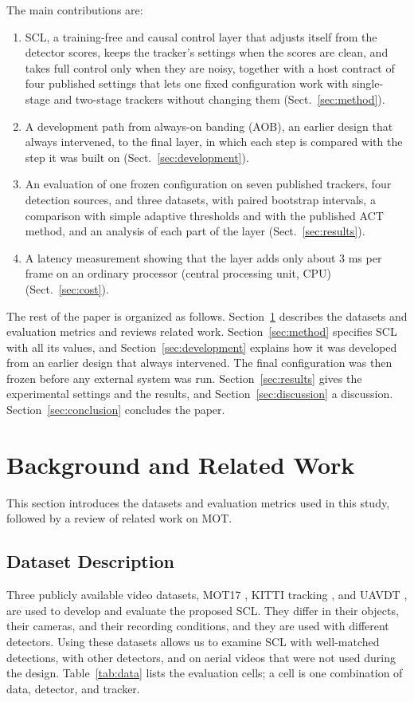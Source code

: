 \documentclass[pdflatex,sn-mathphys-num,iicol]{sn-jnl}
\newcommand{\scl}{SCL}
\newcommand{\aob}{AOB}
\begin{document}
The main contributions are:
\begin{enumerate}
\item \scl{}, a training-free and causal control layer that adjusts itself from the detector scores,
      keeps the tracker's settings when the scores are clean, and takes full control only when they
      are noisy, together with a host contract of four published settings that lets one fixed
      configuration work with single-stage and two-stage trackers without changing them
      (Sect.~\ref{sec:method}).
\item A development path from always-on banding (\aob{}), an earlier design that always
      intervened, to the final layer, in which each step is compared with the step it was built on
      (Sect.~\ref{sec:development}).
\item An evaluation of one frozen configuration on seven published trackers, four detection
      sources, and three datasets, with paired bootstrap intervals, a comparison with simple
      adaptive thresholds and with the published ACT method, and an analysis of each part of the
      layer (Sect.~\ref{sec:results}).
\item A latency measurement showing that the layer adds only about 3 ms per frame on an ordinary
      processor (central processing unit, CPU) (Sect.~\ref{sec:cost}).
\end{enumerate}

The rest of the paper is organized as follows. Section~\ref{sec:related} describes the datasets and
evaluation metrics and reviews related work. Section~\ref{sec:method} specifies \scl{} with all its
values, and Section~\ref{sec:development} explains how it was developed from an earlier design that
always intervened. The final configuration was then frozen before any external system was run.
Section~\ref{sec:results} gives the experimental settings and the results, and
Section~\ref{sec:discussion} a discussion. Section~\ref{sec:conclusion} concludes the paper.
\section{Background and Related Work}\label{sec:related}
This section introduces the datasets and evaluation metrics used in this study, followed by a
review of related work on MOT.

\subsection{Dataset Description}\label{sec:data}
Three publicly available video datasets, MOT17 \cite{milan2016mot16}, KITTI tracking
\cite{geiger2012kitti}, and UAVDT \cite{du2018uavdt}, are used to develop and evaluate the
proposed \scl{}. They differ in their objects, their cameras, and their recording conditions, and
they are used with different detectors. Using these datasets allows us to examine \scl{} with
well-matched detections, with other detectors, and on aerial videos that were not used during the
design. Table~\ref{tab:data} lists the evaluation cells; a cell is one combination of data,
detector, and tracker.
\end{document}
